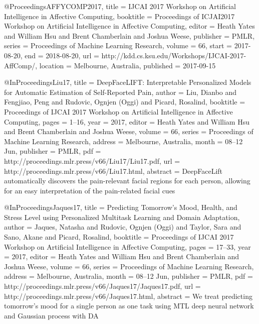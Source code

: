 @Proceedings{AFFYCOMP2017,
  title =     {IJCAI 2017 Workshop on Artificial Intelligence in Affective Computing},
  booktitle = {Proceedings of ICJAI2017 Workshop on Artificial Intelligence in Affective Computing},
  editor =    {Heath Yates and William Hsu and Brent Chamberlain and Joshua Weese},
  publisher = {PMLR},
  series =    {Proceedings of Machine Learning Research},
  volume =    66, 
  start = {2017-08-20},
  end = {2018-08-20}, 
  url = {http://kdd.cs.ksu.edu/Workshops/IJCAI-2017-AffComp/},
  location = {Melbourne, Australia}, 
  published = {2017-09-15}
}


@InProceedings{Liu17,
  title = {DeepFaceLIFT: Interpretable Personalized Models for Automatic Estimation of Self-Reported Pain},
  author = {Liu, Dianbo and Fengjiao, Peng and Rudovic, Ognjen (Oggi) and Picard, Rosalind},
  booktitle = {Proceedings of IJCAI 2017 Workshop on Artificial Intelligence in Affective Computing},
  pages = 	 {1--16},
  year = 	 {2017},
  editor =    {Heath Yates and William Hsu and Brent Chamberlain and Joshua Weese},
  volume = 	 {66},
  series = 	 {Proceedings of Machine Learning Research},
  address =  {Melbourne, Australia},
  month = 	 {08--12 Jun},
  publisher = {PMLR},
  pdf = 	 {http://proceedings.mlr.press/v66/Liu17/Liu17.pdf},
  url = 	 {http://proceedings.mlr.press/v66/Liu17.html},
  abstract = {DeepFaceLift automatically discovers the pain-relevant facial regions for each person, allowing for an easy interpretation of the pain-related facial cues}
}


@InProceedings{Jaques17,
  title = {Predicting Tomorrow's Mood, Health, and Stress Level using Personalized Multitask Learning and Domain Adaptation},
  author = {Jaques, Natasha and Rudovic, Ognjen (Oggi) and Taylor, Sara and Sano, Akane and Picard, Rosalind},
  booktitle = {Proceedings of IJCAI 2017 Workshop on Artificial Intelligence in Affective Computing},
  pages = 	 {17--33},
  year = 	 {2017},
  editor =    {Heath Yates and William Hsu and Brent Chamberlain and Joshua Weese},
  volume = 	 {66},
  series = 	 {Proceedings of Machine Learning Research},
  address =  {Melbourne, Australia},
  month = 	 {08--12 Jun},
  publisher = {PMLR},
  pdf = 	 {http://proceedings.mlr.press/v66/Jaques17/Jaques17.pdf},
  url = 	 {http://proceedings.mlr.press/v66/Jaques17.html},
  abstract = {We treat predicting tomorrow's mood for a single person as one task using MTL deep neural network and Gaussian process with DA}
}

